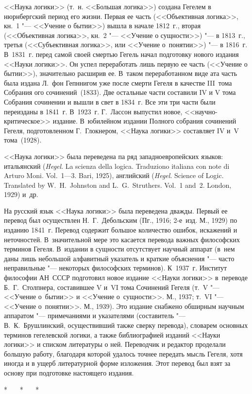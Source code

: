 <<Наука логики>> (т.~н. <<Большая логика>>) создана Гегелем в нюрнбергский
период его жизни. Первая ее часть (<<Объективная логика>>, кн.~1 "--- <<Учение
о бытии>>) вышла в начале 1812~г., вторая (<<Объективная логика>>, кн.~2 "---
<<Учение о сущности>>) "--- в 1813~г., третья (<<Субъективная логика>>, или
<<Учение о~понятии>>) "--- в 1816~г. В~1831~г. перед самой своей смертью Гегель
начал подготовку нового издания <<Науки логики>>. Он успел переработать лишь
первую ее часть (<<Учение о бытии>>), значительно расширив ее. В~таком
переработанном виде ата часть была издана Л.~фон Гепннигом уже после смерти
Гегеля в качестве III~тома Собрания ого сочинений~(1833). Две остальные части
составили IV и V тома Собрания сочинении и вышли в свет в 1834~г. Все эти три
части были переизданы в 1841~г. В~1923~г. Г.~Лассон выпустил новое,
<<научно-критическое>> издание. В~юбилейном издании Полного собрания сочинений
Гегеля, подготовленном Г.~Глокнером, <<Наука логики>>
составляет IV и~V тома~(1928).

<<Наука логики>> была переведена па ряд западноевропейских языков: итальянский
({\em Hegel}. La scienza della logica. Traduziono italiana con note di Arturo
Moni. Vol.~1---3. Bari, 1925), английский ({\em Hegel}. Science of Logic.
Translated by W.~H.~Johnston and L.~G.~Struthers. Vol.~1 and~2. London, 1929)
и~др.

На русский язык <<Наука логики>> была переведена дважды. Первый ее перевод был
осуществлен Н.~Г.~Дебольским (Пг., 1916; 2-е~изд. М., 1929) по изданию 1841~г.
Перевод содержит большое количество ошибок, искажений и неточностей.
В~значительной мере это касается перевода важных философских терминов Гегеля.
В~издании в сущности отсутствует научный аппарат (в~нем даны лишь небольшой
алфавитный указатель и краткие объяснения "--- часто неправильные "---
некоторых философских терминов). К~1937~г. Институт философии АН~СССР
подготовил новое издание <<Науки логики>> в~переводе Б.~Г.~Столпнера,
составившее V и~VI тома Сочинений Гегеля (т.~V "--- <<Учение о~бытии>> и
<<Учение о~сущности>>. М., 1937; т.~VI "--- <<Учение о~понятии>>. М., 1939).
Это издание снабжено обширным научным аппаратом "--- примечаниями и указателями
(составитель "--- В.~К.~Брушлинский, осуществивший также сверку перевода),
словарем основных терминов гегелевской логики, а также библиографией изданий
<<Науки логики>> и списком литературы о ней. Переводчик и редактор проделали
большую работу, благодаря которой удалось точнее передать мысль Гегеля, хотя
иногда и в ущерб литературной форме изложения. Этот перевод был взят за основу
при подготовке настоящего издания.

\bigskip

\begin{center}
* \ \ \ * \ \ \ *
\end{center}

\bigskip

\printpagenotes
